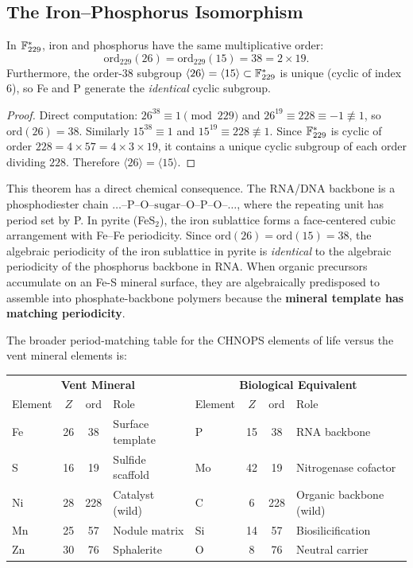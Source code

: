 \subsection{The Iron--Phosphorus Isomorphism}

\begin{theorem}\label{thm:fe_p}
In $\mathbb{F}_{229}^*$, iron and phosphorus have the same multiplicative order:
\[
\mathrm{ord}_{229}(26) = \mathrm{ord}_{229}(15) = 38 = 2 \times 19.
\]
Furthermore, the order-$38$ subgroup $\langle 26 \rangle = \langle 15 \rangle \subset \mathbb{F}_{229}^*$ is unique (cyclic of index $6$), so Fe and P generate the \emph{identical} cyclic subgroup.
\end{theorem}

\begin{proof}
Direct computation: $26^{38} \equiv 1 \pmod{229}$ and $26^{19} \equiv 228 \equiv -1 \not\equiv 1$, so $\mathrm{ord}(26) = 38$. Similarly $15^{38} \equiv 1$ and $15^{19} \equiv 228 \not\equiv 1$. Since $\mathbb{F}_{229}^*$ is cyclic of order $228 = 4 \times 57 = 4 \times 3 \times 19$, it contains a unique cyclic subgroup of each order dividing $228$. Therefore $\langle 26 \rangle = \langle 15 \rangle$. \qedhere
\end{proof}

\noindent This theorem has a direct chemical consequence. The RNA/DNA backbone is a phosphodiester chain $\ldots\text{--P--O--sugar--O--P--O--}\ldots$, where the repeating unit has period set by P. In pyrite (FeS$_2$), the iron sublattice forms a face-centered cubic arrangement with Fe--Fe periodicity. Since $\mathrm{ord}(26) = \mathrm{ord}(15) = 38$, the algebraic periodicity of the iron sublattice in pyrite is \emph{identical} to the algebraic periodicity of the phosphorus backbone in RNA. When organic precursors accumulate on an Fe-S mineral surface, they are algebraically predisposed to assemble into phosphate-backbone polymers because the \textbf{mineral template has matching periodicity}.

The broader period-matching table for the CHNOPS elements of life versus the vent mineral elements is:

\begin{center}
\begin{tabular}{@{}lccl@{}lccl@{}}
\toprule
\multicolumn{4}{c}{\textbf{Vent Mineral}} & \multicolumn{4}{c}{\textbf{Biological Equivalent}} \\
Element & $Z$ & ord & Role & Element & $Z$ & ord & Role \\
\midrule
Fe & 26 & 38 & Surface template & P & 15 & 38 & RNA backbone \\
S  & 16 & 19 & Sulfide scaffold & Mo & 42 & 19 & Nitrogenase cofactor \\
Ni & 28 & 228 & Catalyst (wild) & C & 6 & 228 & Organic backbone (wild) \\
Mn & 25 & 57 & Nodule matrix & Si & 14 & 57 & Biosilicification \\
Zn & 30 & 76 & Sphalerite & O & 8 & 76 & Neutral carrier \\
\bottomrule
\end{tabular}
\end{center}

